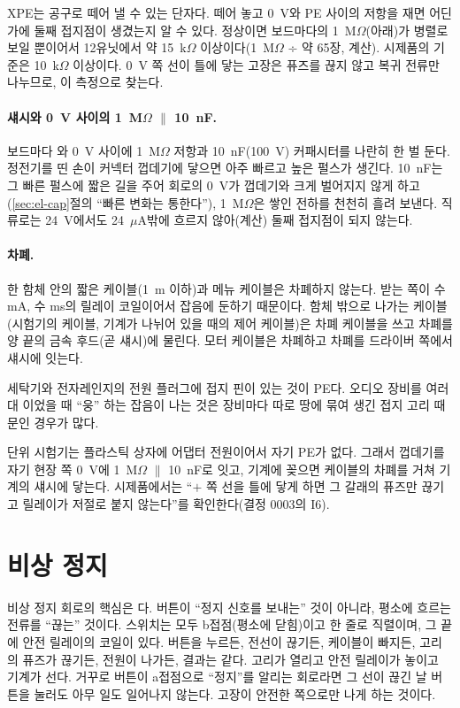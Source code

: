 XPE는 공구로 떼어 낼 수 있는 단자다. 떼어 놓고 0~V와 PE 사이의 저항을 재면 어딘가에 둘째 접지점이 생겼는지 알 수 있다. 정상이면
보드마다의 1~M$\Omega$(아래)가 병렬로 보일 뿐이어서 12유닛에서 약 15~k$\Omega$ 이상이다(1~M$\Omega$ ÷ 약 65장, 계산). 시제품의
기준은 10~k$\Omega$ 이상이다. 0~V 쪽 선이 틀에 닿는 고장은 퓨즈를 끊지 않고 복귀 전류만 나누므로, 이 측정으로 찾는다.

\paragraph{섀시와 0~V 사이의 1~M$\Omega$ $\parallel$ 10~nF.} 보드마다 와 0~V 사이에 1~M$\Omega$ 저항과 10~nF(100~V)
커패시터를 나란히 한 벌 둔다. 정전기를 띤 손이 커넥터 껍데기에 닿으면 아주 빠르고 높은 펄스가 생긴다. 10~nF는 그 빠른 펄스에
짧은 길을 주어 회로의 0~V가 껍데기와 크게 벌어지지 않게 하고(\ref{sec:el-cap}절의 ``빠른 변화는 통한다''), 1~M$\Omega$은 쌓인
전하를 천천히 흘려 보낸다. 직류로는 24~V에서도 24~$\mu$A밖에 흐르지 않아(계산) 둘째 접지점이 되지 않는다.

\paragraph{차폐.} 한 함체 안의 짧은 케이블(1~m 이하)과 메뉴 케이블은 차폐하지 않는다. 받는 쪽이 수 mA, 수 ms의 릴레이 코일이어서
잡음에 둔하기 때문이다. 함체 밖으로 나가는 케이블(시험기의 케이블, 기계가 나뉘어 있을 때의 제어 케이블)은 차폐 케이블을 쓰고
차폐를 양 끝의 금속 후드(곧 섀시)에 물린다. 모터 케이블은 차폐하고 차폐를 드라이버 쪽에서 섀시에 잇는다.

\General 세탁기와 전자레인지의 전원 플러그에 접지 핀이 있는 것이 PE다. 오디오 장비를 여러 대 이었을 때 ``웅'' 하는 잡음이
나는 것은 장비마다 따로 땅에 묶여 생긴 접지 고리 때문인 경우가 많다.

\Ours 단위 시험기는 플라스틱 상자에 어댑터 전원이어서 자기 PE가 없다. 그래서 껍데기를 자기 현장 쪽 0~V에 1~M$\Omega$ $\parallel$
10~nF로 잇고, 기계에 꽂으면 케이블의 차폐를 거쳐 기계의 섀시에 닿는다. 시제품에서는 ``$+$ 쪽 선을 틀에 닿게 하면 그 갈래의
퓨즈만 끊기고 릴레이가 저절로 붙지 않는다''를 확인한다(결정 0003의 I6).

\section{비상 정지}\label{sec:p-estop}

\Why 비상 정지 회로의 핵심은 다. 버튼이 ``정지 신호를 보내는'' 것이 아니라, 평소에
흐르는 전류를 ``끊는'' 것이다. 스위치는 모두 b접점(평소에 닫힘)이고 한 줄로 직렬이며, 그 끝에 안전 릴레이의 코일이 있다. 버튼을
누르든, 전선이 끊기든, 케이블이 빠지든, 고리의 퓨즈가 끊기든, 전원이 나가든, 결과는 같다. 고리가 열리고 안전 릴레이가 놓이고
기계가 선다. 거꾸로 버튼이 a접점으로 ``정지''를 알리는 회로라면 그 선이 끊긴 날 버튼을 눌러도 아무 일도 일어나지 않는다. 고장이
안전한 쪽으로만 나게 하는 것이다.


